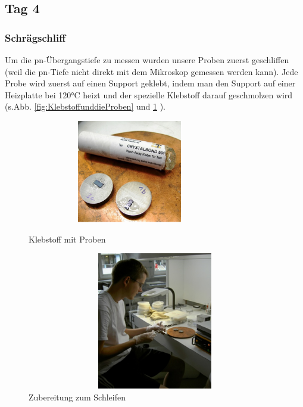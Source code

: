 \subsection[Tag 4]{Tag 4}

\subsubsection[Schrägschliff]{Schrägschliff }

Um die pn-Übergangstiefe zu messen wurden unsere Proben zuerst geschliffen (weil die pn-Tiefe nicht direkt mit dem Mikroskop gemessen werden kann).
Jede Probe wird zuerst auf einen Support geklebt, indem man den Support auf einer Heizplatte bei 120°C heizt und der spezielle Klebstoff darauf geschmolzen wird (s.Abb. \ref{fig:KlebstoffunddieProben} und \ref{fig:ZubereitungzumSchleifen} ).

\begin{figure}[H]
\centering
\begin{minipage}[hbt]{6cm}
    \centering
    \includegraphics[width=0.8\textwidth, height=4.5cm]{bilder/KlebstoffunddieProben.png}
  \caption{Klebstoff mit Proben}
  \label{fig:KlebstoffunddieProben}
\end{minipage}
\hfill
\begin{minipage}[hbt]{7cm}
    \centering
    \includegraphics[width=1\textwidth,height=6cm]{bilder/ZubereitungzumSchleifen.png}
  \caption{Zubereitung zum Schleifen}
  \label{fig:ZubereitungzumSchleifen}
\end{minipage}

\end{figure}



